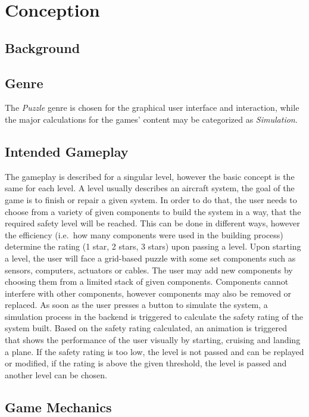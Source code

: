 \section{Conception}\label{sec:conception}
\subsection{Background}\label{subsec:background}

\subsection{Genre}\label{subsec:genre}
The \textit{Puzzle} genre is chosen for the graphical user interface and interaction, while the major calculations for the
games' content may be categorized as \textit{Simulation}.

\subsection{Intended Gameplay}\label{subsec:intended-gameplay}
The gameplay is described for a singular level, however the basic concept is the same for each level.
A level usually describes an aircraft system, the goal of the game is to finish or repair a given system.
In order to do that, the user needs to choose from a variety of given components to build the system in a way, that the
required safety level will be reached.
This can be done in different ways, however the efficiency (i.e.\ how many components were used in the building process) determine
the rating (1 star, 2 stars, 3 stars) upon passing a level.
Upon starting a level, the user will face a grid-based puzzle with some set components such as sensors, computers, actuators
or cables.
The user may add new components by choosing them from a limited stack of given components.
Components cannot interfere with other components, however components may also be removed or replaced.
As soon as the user presses a button to simulate the system, a simulation process in the backend is triggered to calculate
the safety rating of the system built.
Based on the safety rating calculated, an animation is triggered that shows the performance of the user visually by starting, cruising
and landing a plane.
If the safety rating is too low, the level is not passed and can be replayed or modified, if the rating is above the given
threshold, the level is passed and another level can be chosen.

\subsection{Game Mechanics}\label{subsec:game-mechanics}

